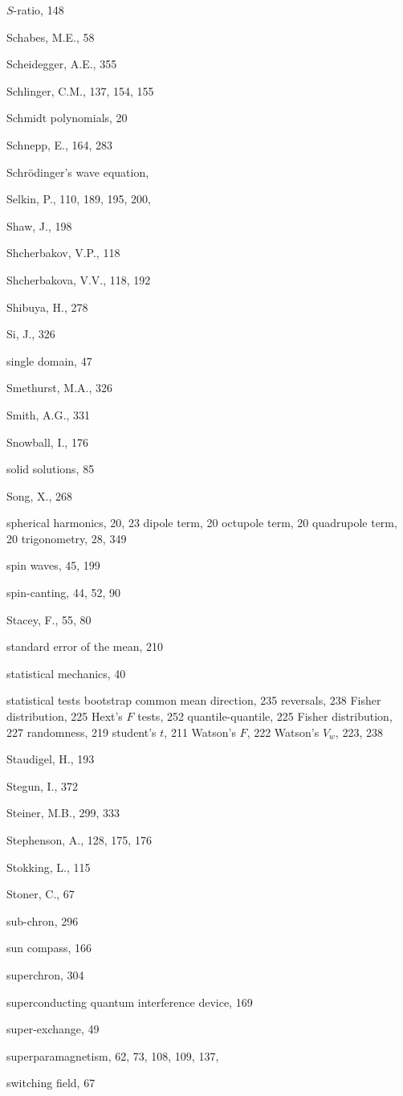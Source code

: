 \documentclass[,plain]{tauxe}
\begin{document}
\begin{theindex}
  \item $S$-ratio, 148
  \item Schabes, M.E., 58
  \item Scheidegger, A.E., 355
  \item Schlinger, C.M., 137, 154, 155
  \item Schmidt polynomials, 20
  \item Schnepp, E., 164, 283
  \item Schr\"odinger's wave equation,
  \item Selkin, P., 110, 189, 195, 200,
  \item Shaw, J., 198
  \item Shcherbakov, V.P., 118
  \item Shcherbakova, V.V., 118, 192
  \item Shibuya, H., 278
  \item Si, J., 326
  \item single domain, 47
  \item Smethurst, M.A., 326
  \item Smith, A.G., 331
  \item Snowball, I., 176
  \item solid solutions, 85
  \item Song, X., 268
  \item spherical
    \subitem harmonics, 20, 23
      \subsubitem dipole term, 20
      \subsubitem octupole term, 20
      \subsubitem quadrupole term, 20
    \subitem trigonometry, 28, 349
  \item spin waves, 45, 199
  \item spin-canting, 44, 52, 90
  \item Stacey, F., 55, 80
  \item standard error of the mean, 210
  \item statistical mechanics, 40
  \item statistical tests
    \subitem bootstrap
      \subsubitem common mean direction, 235
      \subsubitem reversals, 238
    \subitem Fisher distribution, 225
    \subitem Hext's $F$ tests, 252
    \subitem quantile-quantile, 225
      \subsubitem Fisher distribution, 227
    \subitem randomness, 219
    \subitem student's $t$, 211
    \subitem Watson's $F$, 222
    \subitem Watson's $V_w$, 223, 238
  \item Staudigel, H., 193
  \item Stegun, I., 372
  \item Steiner, M.B., 299, 333
  \item Stephenson, A., 128, 175, 176
  \item Stokking, L., 115
  \item Stoner, C., 67
  \item sub-chron, 296
  \item sun compass, 166
  \item superchron, 304
  \item superconducting quantum interference device, 169
  \item super-exchange, 49
  \item superparamagnetism, 62, 73, 108, 109, 137,
  \item switching field, 67


\end{theindex}
\end{document}
